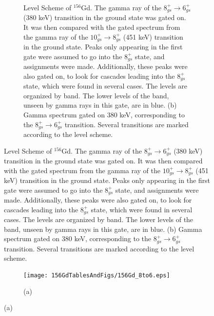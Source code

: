 \begin{figure}[!]
    \centering
    \label{fig:156_8to6}
    \begin{subfigure}{\textwidth}
    \caption{\centering \fontsize{10pt}{12pt}Level Scheme of $^{156}$Gd. The gamma ray of the $8^+_{gs}\rightarrow 6^+_{gs}$ (380 keV) transition in the ground state was gated on. It was then compared with the gated spectrum from the gamma ray of the $10^+_{gs}\rightarrow 8^+_{gs}$ (451 keV) transition in the ground state. Peaks only appearing in the first gate were assumed to go into the $8^+_{gs}$ state, and assignments were made. Additionally, these peaks were also gated on, to look for cascades leading into the $8^+_{gs}$ state, which were found in several cases. The levels are organized by band. The lower levels of the band, unseen by gamma rays in this gate, are in blue. (b) Gamma spectrum gated on 380 keV, corresponding to the $8^+_{gs}\rightarrow 6^+_{gs}$ transition. Several transitions are marked according to the level scheme.}
    \end{subfigure}
\end{figure}
\clearpage
\begin{figure}
    \ContinuedFloat
    \begin{subfigure}{\textwidth}
    \texttt{[image: 156GdTablesAndFigs/156Gd\_8to6.eps]}
    \caption*{(a)}
    \label{fig:156_8to6level}
    \end{subfigure}
    \end{figure}
